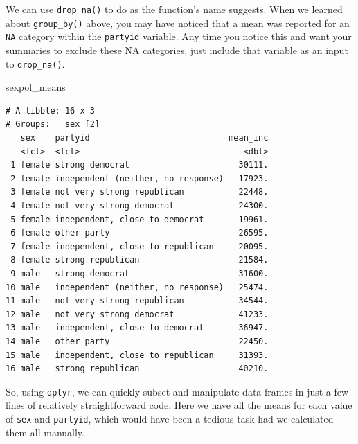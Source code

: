 \documentclass[
  letterpaper,
  DIV=11,
  numbers=noendperiod]{scrreprt}
\newenvironment{Shaded}{\begin{snugshade}}{\end{snugshade}}
\newcommand{\NormalTok}[1]{\textcolor[rgb]{0.00,0.23,0.31}{#1}}
\begin{document}
\begin{tcolorbox}[enhanced jigsaw, colframe=quarto-callout-note-color-frame, arc=.35mm, coltitle=black, breakable, rightrule=.15mm, left=2mm, opacitybacktitle=0.6, colbacktitle=quarto-callout-note-color!10!white, toptitle=1mm, bottomtitle=1mm, titlerule=0mm, leftrule=.75mm, colback=white, title=\textcolor{quarto-callout-note-color}{\faInfo}\hspace{0.5em}{Note}, opacityback=0, bottomrule=.15mm, toprule=.15mm]

We can use \texttt{drop\_na()} to do as the function's name suggests.
When we learned about \texttt{group\_by()} above, you may have noticed
that a mean was reported for an \texttt{NA} category within the
\texttt{partyid} variable. Any time you notice this and want your
summaries to exclude these NA categories, just include that variable as
an input to \texttt{drop\_na()}.

\end{tcolorbox}

\begin{Shaded}
\begin{Highlighting}[]
\NormalTok{sexpol\_means}
\end{Highlighting}
\end{Shaded}

\begin{verbatim}
# A tibble: 16 x 3
# Groups:   sex [2]
   sex    partyid                            mean_inc
   <fct>  <fct>                                 <dbl>
 1 female strong democrat                      30111.
 2 female independent (neither, no response)   17923.
 3 female not very strong republican           22448.
 4 female not very strong democrat             24300.
 5 female independent, close to democrat       19961.
 6 female other party                          26595.
 7 female independent, close to republican     20095.
 8 female strong republican                    21584.
 9 male   strong democrat                      31600.
10 male   independent (neither, no response)   25474.
11 male   not very strong republican           34544.
12 male   not very strong democrat             41233.
13 male   independent, close to democrat       36947.
14 male   other party                          22450.
15 male   independent, close to republican     31393.
16 male   strong republican                    40210.
\end{verbatim}

So, using \texttt{dplyr}, we can quickly subset and manipulate data
frames in just a few lines of relatively straightforward code. Here we
have all the means for each value of \texttt{sex} and \texttt{partyid},
which would have been a tedious task had we calculated them all
manually.
\end{document}

